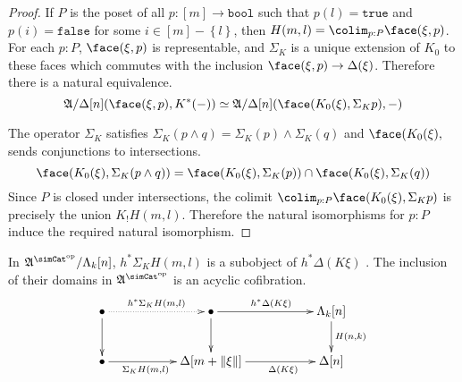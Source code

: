 \documentclass{tac}
\newcommand\set[1]{\left\{#1\right\}}
\newcommand\ri{^*}
\newcommand\dual{^{\mathrm{op}}}
\newcommand\s{^{\simCat\dual}}
\newcommand\of{:}
\newcommand\simplex\Delta
\newcommand\horn\Lambda
\newcommand\true{\mathtt{true}}
\newcommand\false{\mathtt{false}}
\newcommand\bool{\mathtt{bool}}
\newcommand\norm[1]{\Vert #1 \Vert}
\newcommand\depsum{\Sigma_}
\newcommand\ambient{\mathfrak A}
\begin{document}
\begin{proof} If $P$ is the poset of all $p\of[m]\to\bool$ such that $p(l)=\true$ and $p(i)=\false$ for some $i\in [m]-\set{l}$, then $H(m,l) = \colim_{p\of P}\face(\xi,p)$.
For each $p\of P$, $\face(\xi,p)$ is representable, and $\depsum K$ is a unique extension of $K_0$ to these faces which commutes with the inclusion $\face(\xi,p)\to\simplex(\xi)$. Therefore there is a natural equivalence.
\[ \ambient/\simplex[n](\face(\xi,p),K\ri(-))\simeq \ambient/\simplex[n](\face(K_0(\xi),\depsum K p),-) \]

The operator $\depsum K$ satisfies $\depsum K(p\land q)=\depsum K(p)\land \depsum K(q)$ and $\face(K_0(\xi),$ sends conjunctions to intersections.
\[ \face(K_0(\xi),\depsum K(p\land q)) = \face(K_0(\xi),\depsum K(p))\cap \face(K_0(\xi),\depsum K(q)) \]
Since $P$ is closed under intersections, the colimit $\colim_{p\of P}\face(K_0(\xi),\depsum K p)$ is precisely the union $K_!H(m,l)$. Therefore the natural isomorphisms for $p:P$ induce the required natural isomorphism.
\end{proof}

\begin{lemma} In $\ambient\s/\horn_k[n]$, $h\ri \depsum K H(m,l)$ is a subobject of $h\ri\simplex(K\xi)$ . The inclusion of their domains in $\ambient\s$ is an acyclic cofibration. \label{acyclic cofibrancy} 
\[\xymatrix{
\bullet \ar@{.>}[rr]^{h\ri \depsum K H(m,l)} \ar[d] && \bullet\ar[rr]^{h\ri\simplex(K\xi)}\ar[d] && \horn_k[n]\ar[d]^{H(n,k)}\\
\bullet\ar[rr]_(.4){\depsum K H(m,l)} && \simplex[m+\norm\xi]\ar[rr]_(.6){\simplex(K\xi)} && \simplex[n]
}\]
\end{lemma}
\end{document}
